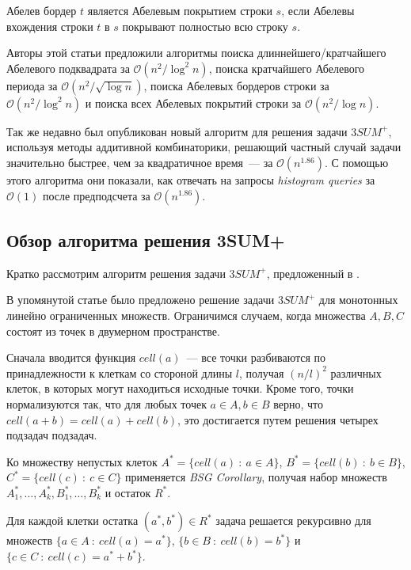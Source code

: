 \begin{definition}
Абелев бордер $t$ является Абелевым покрытием строки $s$, если Абелевы вхождения строки $t$ в $s$ покрывают полностью всю строку $s$.
\end{definition}

Авторы этой статьи предложили алгоритмы поиска длиннейшего/кратчайшего Абелевого подквадрата за $\mathcal{O}(n^2 / \log^2 n)$, поиска кратчайшего Абелевого периода за $\mathcal{O}(n^2 / \sqrt{\log n})$, поиска Абелевых бордеров строки за $\mathcal{O}(n^2 / \log^2 n)$ и поиска всех Абелевых покрытий строки за $\mathcal{O}(n^2 / \log n)$.

Так же недавно был опубликован новый алгоритм для решения задачи $3SUM^+$, используя методы аддитивной комбинаторики, решающий частный случай задачи значительно быстрее, чем за квадратичное время~--- за $\mathcal{O}(n^{1.86})$. С помощью этого алгоритма они показали, как отвечать на запросы \textit{histogram queries} за $\mathcal{O}(1)$ после предподсчета за $\mathcal{O}(n^{1.86})$.

\subsection{Обзор алгоритма решения 3SUM+}

Кратко рассмотрим алгоритм решения задачи $3SUM^+$, предложенный в \cite{2}. 

В упомянутой статье было предложено решение задачи $3SUM^+$ для монотонных линейно ограниченных множеств. Ограничимся случаем, когда множества $A, B, C$ состоят из точек в двумерном пространстве.

Сначала вводится функция $cell(a)$~--- все точки разбиваются по принадлежности к клеткам со стороной длины $l$, получая $(n/l)^2$ различных клеток, в которых могут находиться исходные точки. Кроме того, точки нормализуются так, что для любых точек $a \in A, b \in B$ верно, что $cell(a+b)=cell(a)+cell(b)$, это достигается путем решения четырех подзадач подзадач.

Ко множеству непустых клеток $A^* = \{cell(a)\ :\ a \in A\}$,  $B^* = \{cell(b)\ :\ b \in B\}$, $C^* = \{cell(c)\ :\ c \in C\}$ применяется \textit{BSG Corollary}, получая набор множеств $A_1^*, \ldots, A_k^*, B_1^*, \ldots, B_k^*$ и остаток $R^*$.

Для каждой клетки остатка $(a^*, b^*) \in R^*$ задача решается рекурсивно для множеств $\{a \in A\ :\ cell(a)=a^*\}$, $\{b \in B\ :\ cell(b)=b^*\}$ и $\{c \in C\ :\ cell(c)=a^*+b^*\}$.

